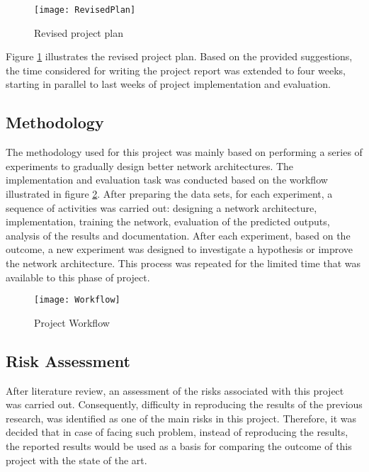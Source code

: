 \begin{figure}[h]
    \centering
    \texttt{[image: RevisedPlan]}
    \caption{Revised project plan}
    \label{fig:revisedplan}
\end{figure}

Figure \ref{fig:revisedplan} illustrates the revised project plan. Based on the provided suggestions, the time considered for writing the project report was extended to four weeks, starting in parallel to last weeks of project implementation and evaluation. 

\subsection{Methodology}
The methodology used for this project was mainly based on performing a series of experiments to gradually design better network architectures. The implementation and evaluation task was conducted based on the workflow illustrated in figure \ref{fig:workflow}. After preparing the data sets, for each experiment, a sequence of activities was carried out: designing a network architecture, implementation, training the network, evaluation of the predicted outputs, analysis of the results and documentation. After each experiment, based on the outcome, a new experiment was designed to investigate a hypothesis or improve the network architecture. This process was repeated for the limited time that was available to this phase of project.  

\begin{figure}
    \centering
    \texttt{[image: Workflow]}
    \caption{Project Workflow}
    \label{fig:workflow}
\end{figure}

\subsection{Risk Assessment}

After literature review, an assessment of the risks associated with this project was carried out. Consequently, difficulty in reproducing the results of the previous research, was identified as one of the main risks in this project. Therefore, it was decided that in case of facing such problem, instead of reproducing the results, the reported results would be used as a basis for comparing the outcome of this project with the state of the art.  
